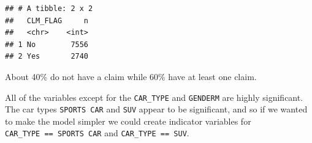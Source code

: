\documentclass[openany]{book}
\newenvironment{Shaded}{\begin{snugshade}}{\end{snugshade}}
\newcommand{\DataTypeTok}[1]{\textcolor[rgb]{0.13,0.29,0.53}{#1}}
\newcommand{\DecValTok}[1]{\textcolor[rgb]{0.00,0.00,0.81}{#1}}
\newcommand{\FloatTok}[1]{\textcolor[rgb]{0.00,0.00,0.81}{#1}}
\newcommand{\KeywordTok}[1]{\textcolor[rgb]{0.13,0.29,0.53}{\textbf{#1}}}
\newcommand{\NormalTok}[1]{#1}
\newcommand{\OperatorTok}[1]{\textcolor[rgb]{0.81,0.36,0.00}{\textbf{#1}}}
\newcommand{\StringTok}[1]{\textcolor[rgb]{0.31,0.60,0.02}{#1}}
\begin{document}
\begin{verbatim}
## # A tibble: 2 x 2
##   CLM_FLAG     n
##   <chr>    <int>
## 1 No        7556
## 2 Yes       2740
\end{verbatim}

About 40\% do not have a claim while 60\% have at least one claim.

\begin{Shaded}
\end{Shaded}

All of the variables except for the \texttt{CAR\_TYPE} and \texttt{GENDERM} are highly significant. The car types \texttt{SPORTS\ CAR} and \texttt{SUV} appear to be significant, and so if we wanted to make the model simpler we could create indicator variables for \texttt{CAR\_TYPE\ ==\ SPORTS\ CAR} and \texttt{CAR\_TYPE\ ==\ SUV}.
\end{document}

